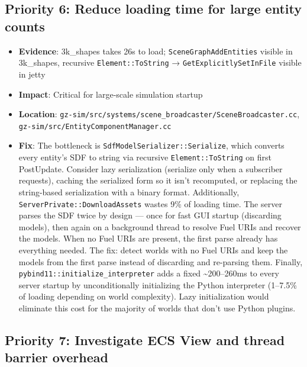 \documentclass[11pt, a4paper]{article}
\providecommand{\tightlist}{%
  \setlength{\itemsep}{0pt}\setlength{\parskip}{0pt}}
\begin{document}
\hypertarget{priority-4-reduce-loading-time-for-large-entity-counts}{%
\subsection{Priority 6: Reduce loading time for large entity
counts}\label{priority-4-reduce-loading-time-for-large-entity-counts}}

\begin{itemize}
\tightlist
\item
  \textbf{Evidence}: 3k\_shapes takes 26s to load;
  \texttt{SceneGraphAddEntities} visible in 3k\_shapes, recursive
  \texttt{Element::ToString} → \texttt{GetExplicitlySetInFile} visible
  in jetty
\item
  \textbf{Impact}: Critical for large-scale simulation startup
\item
  \textbf{Location}:
  \texttt{gz-sim/src/systems/scene\_broadcaster/SceneBroadcaster.cc},
  \texttt{gz-sim/src/EntityComponentManager.cc}
\item
  \textbf{Fix}: The bottleneck is
  \texttt{SdfModelSerializer::Serialize}, which converts every entity's
  SDF to string via recursive \texttt{Element::ToString} on first
  PostUpdate. Consider lazy serialization (serialize only when a
  subscriber requests), caching the serialized form so it isn't
  recomputed, or replacing the string-based serialization with a binary
  format.
  Additionally, \texttt{ServerPrivate::DownloadAssets} wastes 9\% of loading time.
  The server parses the SDF twice by design --- once for fast GUI startup (discarding
  models), then again on a background thread to resolve Fuel URIs and recover the models.
  When no Fuel URIs are present, the first parse already has everything needed. The fix:
  detect worlds with no Fuel URIs and keep the models from the first parse instead of
  discarding and re-parsing them.
  Finally, \texttt{pybind11::initialize\_interpreter} adds a fixed \textasciitilde 200--260ms
  to every server startup by unconditionally initializing the Python interpreter
  (1--7.5\% of loading depending on world complexity). Lazy initialization
  would eliminate this cost for the majority of worlds that don't use Python plugins.
\end{itemize}

\hypertarget{priority-5-investigate-ecs-view-and-thread-barrier-overhead}{%
\subsection{Priority 7: Investigate ECS View and thread barrier
overhead}\label{priority-5-investigate-ecs-view-and-thread-barrier-overhead}}
\end{document}
